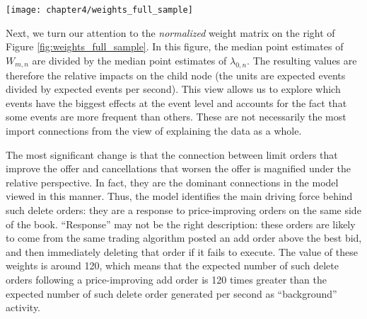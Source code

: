 		\begin{sidewaysfigure}[p]
			\small
			\linespread{1}
			\centering
			\texttt{[image: chapter4/weights\_full\_sample]}
			\captionsetup{skip=-20pt, position=below, font=footnotesize, justification=justified, width=\linewidth}
			\caption[Median connection weight point estimates]{Median connection weight point estimates. The figure shows the median connection strength between event types across the full sample of stocks. Larger values indicate stronger connections, which are expected to generate a greater number of child events. (Left) The median of connection weight estimates using the raw weight matrix estimates. This figure identifies the most important connections in an absolute sense. (Right) The median connection weight matrix after normalizing parent-child weights by the estimated background rate of child events. This figure identifies the most important connections in a relative sense.}
			\label{fig:weights_full_sample}
		\end{sidewaysfigure}

		Next, we turn our attention to the \textit{normalized} weight matrix on the right of Figure \ref{fig:weights_full_sample}. In this figure, the median point estimates of $W_{m,n}$ are divided by the median point estimates of $\lambda_{0,n}$. The resulting values are therefore the relative impacts on the child node (the units are expected events divided by expected events per second). This view allows us to explore which events have the biggest effects at the event level and accounts for the fact that some events are more frequent than others. These are not necessarily the most import connections from the view of explaining the data as a whole.

		The most significant change is that the connection between limit orders that improve the offer and cancellations that worsen the offer is magnified under the relative perspective. In fact, they are the dominant connections in the model viewed in this manner. Thus, the model identifies the main driving force behind such delete orders: they are a response to price-improving orders on the same side of the book. “Response” may not be the right description: these orders are likely to come from the same trading algorithm posted an add order above the best bid, and then immediately deleting that order if it fails to execute. The value of these weights is around 120, which means that the expected number of such delete orders following a price-improving add order is 120 times greater than the expected number of such delete order generated per second as “background” activity.

